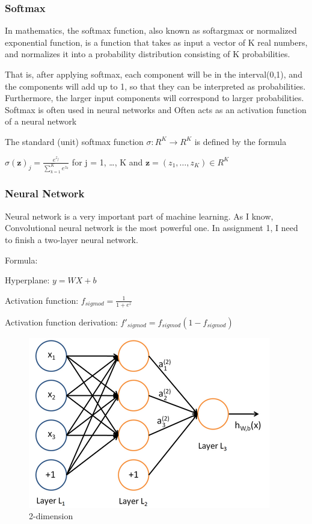\documentclass{article} %
\begin{document}
\subsubsection{Softmax}
In mathematics, the softmax function, also known as softargmax or normalized exponential function, is a function that takes as input a vector of K real numbers, and normalizes it into a probability distribution consisting of K probabilities. 

That is, after applying softmax, each component will be in the interval(0,1), and the components will add up to 1, so that they can be interpreted as probabilities. Furthermore, the larger input components will correspond to larger probabilities. Softmax is often used in neural networks and Often acts as an activation function of a neural network


The standard (unit) softmax function ${\displaystyle \sigma : {R} ^{K}\to {R} ^{K}}$ is defined by the formula

${\displaystyle \sigma (\mathbf {z} )_{j}={\frac {e^{z_{j}}}{\sum _{k=1}^{K}e^{z_{k}}}}}$
for j = 1, …, K and ${\displaystyle {\mathbf {z}}=(z_{1},\ldots ,z_{K})\in  {R} ^{K}}$


\subsubsection{Neural Network}
Neural network is a very important part of machine learning. As I know, Convolutional neural network is the most powerful one. In assignment 1, I need to finish a two-layer neural network. 

Formula: 

Hyperplane: ${\displaystyle y = W X+b}$

Activation function: ${\displaystyle f_{sigmod} = \frac{1}{1+e^{z}}}$

Activation function derivation: ${\displaystyle f'_{sigmod} = f_{sigmod}(1-f_{sigmod})}$

\begin{figure}[h]
	\centering  %
	\includegraphics[width=.4\textwidth]{4.png} 
	\caption{2-dimension}  %
	\label{fig:f3}
\end{figure}
\end{document}
